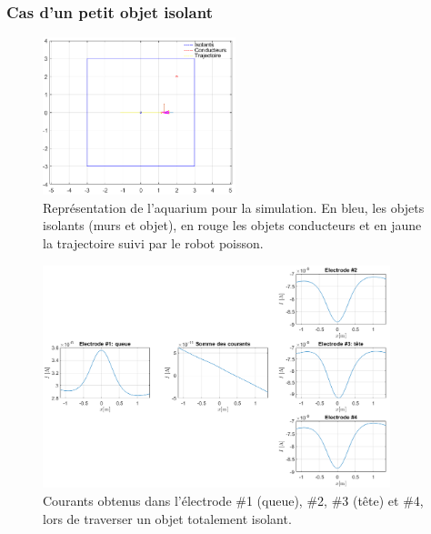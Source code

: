 \subsubsection{Cas d'un petit objet isolant}
\begin{figure}[h!]
    \centering
    \includegraphics[width=0.5\textwidth]{assets/plot_currents/objet_isolant_2/objet_isolant_2_trajectoire.png}
    \caption{Représentation de l'aquarium pour la simulation. En bleu, les objets isolants (murs et objet), en rouge les objets conducteurs et en jaune la trajectoire suivi par le robot poisson.}
    \label{fig:objet_isolant_2_trajectoire}
\end{figure}
\begin{figure}[h!]
    \centering
    \includegraphics[width=0.9\textwidth]{assets/plot_currents/objet_isolant_2/objet_isolant_2.png}
    \caption{Courants obtenus dans l'électrode \#1 (queue), \#2, \#3 (tête) et \#4, lors de traverser un objet totalement isolant.}
    \label{fig:objet_isolant_2}
\end{figure}
\clearpage
